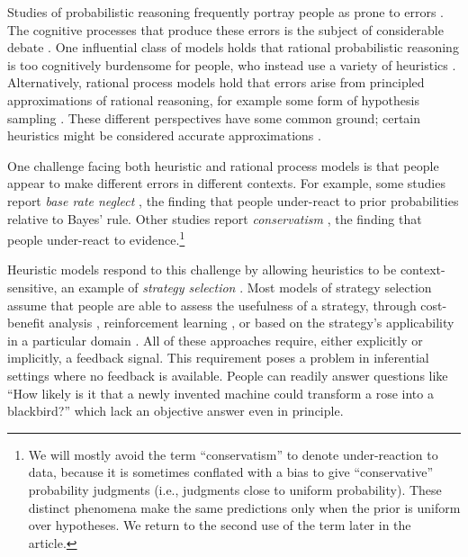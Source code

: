 Studies of probabilistic reasoning frequently portray people as prone to errors \citep{tversky1974judgment,slovic1971comparison,grether1980bayes,fischhoff1983hypothesis}. The cognitive processes that produce these errors is the subject of considerable debate \citep{mellers2001frequency,gigerenzer1996narrow,samuels2012ending}. One influential class of models holds that rational probabilistic reasoning is too cognitively burdensome for people, who instead use a variety of heuristics \citep{tversky1974judgment,gigerenzer1996reasoning,shah2008heuristics}. Alternatively, rational process models hold that errors arise from principled approximations of rational reasoning, for example some form of hypothesis sampling \citep{dasgupta2017hypotheses,sanborn2016bayesian,griffiths2012bridging}. These different perspectives have some common ground; certain heuristics might be considered accurate approximations \citep{gigerenzer2009homo,parpart2018heuristics,belousov2016catching}.

One challenge facing both heuristic and rational process models is that people appear to make different errors in different contexts. For example, some studies report \emph{base rate neglect} \citep{bar1980base,birnbaum1983base,grether1980bayes,kahneman1973psychology}, the finding that people under-react to prior probabilities relative to Bayes' rule. Other studies report \emph{conservatism} \citep{phillips1966conservatism, peterson1965sensitivity}, the finding that people under-react to evidence.\footnote{We will mostly avoid the term ``conservatism'' to denote under-reaction to data, because it is sometimes conflated with a bias to give ``conservative'' probability judgments (i.e., judgments close to uniform probability). These distinct phenomena make the same predictions only when the prior is uniform over hypotheses. We return to the second use of the term later in the article.}

Heuristic models respond to this challenge by allowing heuristics to be context-sensitive, an example of \emph{strategy selection} \citep{gigerenzer2008heuristics,marewski2014strategy}. Most models of strategy selection assume that people are able to assess the usefulness of a strategy, through cost-benefit analysis \citep{johnson85,beach1978contingency,lieder2017strategy}, reinforcement learning \citep{erev05,rieskamp06}, or based on the strategy's applicability in a particular domain \citep{marewski2011cognitive,schulz2016simple}. All of these approaches require, either explicitly or implicitly, a feedback signal. This requirement poses a problem in inferential settings where no feedback is available. People can readily answer questions like ``How likely is it that a newly invented machine could transform a rose into a blackbird?'' \citep{Griffiths15} which lack an objective answer even in principle.  

